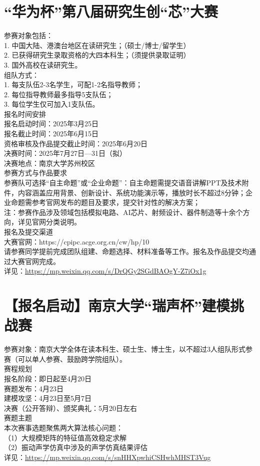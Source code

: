 \documentclass[letterpaper, 12pt]{article}
\begin{document}
\begin{multicols}{2}
\section{ “华为杯”第八届研究生创“芯”大赛}
参赛对象包括：
\\1. 中国大陆、港澳台地区在读研究生；（硕士/博士/留学生）
\\2. 已获得研究生录取资格的大四本科生；（须提供录取证明）
\\3. 国外高校在读研究生。
\\组队方式：
\\1. 每支队伍2-3名学生，可配1-2名指导教师；
\\2. 每位指导教师最多指导5支队伍；
\\3. 每位学生仅可加入1支队伍。
\\报名时间安排
\\报名启动时间：2025年3月25日
\\报名截止时间：2025年6月15日
\\资格审核及作品提交截止时间：2025年6月20日
\\决赛时间：2025年7月27日—31日（拟）
\\决赛地点：南京大学苏州校区
\\参赛方式与作品要求
\\参赛队可选择“自主命题”或“企业命题”：自主命题需提交语音讲解PPT及技术附件，内容涵盖应用背景、创新设计、系统功能演示等，播放时长不超过8分钟；企业命题需参考官网发布的题目及要求，提交针对性的解决方案；
\\注：参赛作品涉及领域包括模拟电路、AI芯片、射频设计、器件制造等十余个方向，详见官网分类说明。
\\报名及提交渠道
\\大赛官网：https://cpipc.acge.org.cn/cw/hp/10
\\请参赛同学提前完成团队组建、命题选择、材料准备等工作。报名及作品提交均通过大赛官网完成。
\\详见：\url{https://mp.weixin.qq.com/s/DrQGy2SGdBAOgY-Z7iOx1g}

\section{【报名启动】南京大学“瑞声杯”建模挑战赛}
参赛对象：南京大学全体在读本科生、硕士生、博士生，以不超过3人组队形式参赛（可以单人参赛、鼓励跨学院组队）。
\\赛程规划
\\报名阶段：即日起至4月20日
\\赛题发布：4月23日
\\建模攻坚：4月23日至5月7日
\\决赛（公开答辩）、颁奖典礼：5月20日左右
\\赛题主题
\\本次赛事选题聚焦两大算法核心问题：
\\（1）大规模矩阵的特征值高效稳定求解
\\（2）振动声学仿真中涉及的声学仿真结果评估
\\详见：\url{https://mp.weixin.qq.com/s/snHHXpwhiCSHwhMHST3Vug}


\end{multicols}
\end{document}
